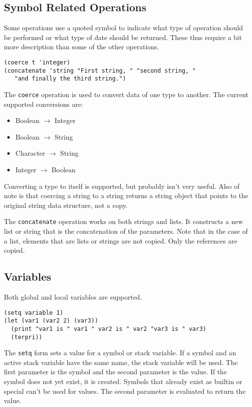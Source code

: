 \documentclass[10pt, openany]{book}
\newcommand{\function}[1]{\texttt{#1}}
\begin{document}
\subsection{Symbol Related Operations}
Some operations use a quoted symbol to indicate what type of operation should be performed or what type of date should be returned.  These thus require a bit more description than some of the other operations.
\begin{lstlisting}
(coerce t 'integer)
(concatenate 'string "First string, " "second string, "
   "and finally the third string.")
\end{lstlisting}

The \function{coerce} operation is used to convert data of one type to another.  The current supported conversions are:
\begin{itemize}
\item Boolean $\rightarrow$ Integer
\item Boolean $\rightarrow$ String
\item Character $\rightarrow$ String
\item Integer $\rightarrow$ Boolean
\end{itemize}

Converting a type to itself is supported, but probably isn't very useful.  Also of note is that coercing a string to a string returns a string object that points to the original string data structure, not a copy.

The \function{concatenate} operation works on both strings and lists.  It constructs a new list or string that is the concatenation of the parameters.  Note that in the case of a list, elements that are lists or strings are not copied.  Only the references are copied.

\subsection{Variables}
Both global and local variables are supported.
\begin{lstlisting}
(setq variable 1)
(let (var1 (var2 2) (var3))
  (print "var1 is " var1 " var2 is " var2 "var3 is " var3)
  (terpri))
\end{lstlisting}

The \function{setq} form sets a value for a symbol or stack variable.  If a symbol and an active stack variable have the same name, the stack variable will be used.  The first parameter is the symbol and the second parameter is the value.  If the symbol does not yet exist, it is created.  Symbols that already exist as builtin or special can't be used for values.  The second parameter is evaluated to return the value.
\end{document}
